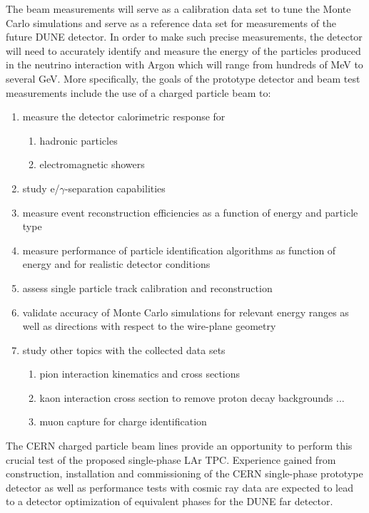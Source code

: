 The beam measurements will serve as a calibration data set to tune the Monte Carlo simulations and serve as a reference data set for measurements of the future DUNE detector. 
%
In order to make such precise measurements, the detector will need to accurately identify and measure the energy of the particles produced in the neutrino interaction with Argon which will range from hundreds of MeV to several GeV.
%
More specifically, the goals of the prototype detector and beam test measurements include the use of a charged particle beam to:
\begin{enumerate}
\item measure the detector calorimetric response for
\begin{enumerate}
	\item hadronic particles
	\item electromagnetic showers
\end{enumerate}
\item study e/$\gamma$-separation capabilities
\item measure event reconstruction efficiencies as a function of energy and particle type
\item measure performance of particle identification algorithms as function of energy and for realistic detector conditions
\item assess single particle track calibration and reconstruction
\item validate accuracy of Monte Carlo simulations for relevant energy ranges as well as directions with respect to the wire-plane geometry

\item study other topics with the collected data sets
 \begin{enumerate}
    \item pion interaction kinematics and cross sections
    \item kaon interaction cross section to remove proton decay backgrounds ...
    \item muon capture for charge identification
 \end{enumerate}
\end{enumerate}
%
The CERN charged particle beam lines provide an opportunity to perform this crucial test of the 
proposed single-phase LAr TPC.
%
%
Experience gained from construction, installation and commissioning of the CERN single-phase prototype detector 
as well as performance tests with cosmic ray data are expected to lead to a detector optimization of equivalent phases 
for the DUNE far detector. 

